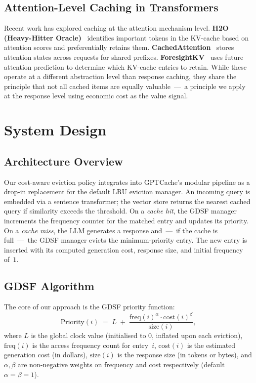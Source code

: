 \documentclass[sigconf, nonacm, review=false, screen=true]{acmart}
\begin{document}
\subsection{Attention-Level Caching in Transformers}
Recent work has explored caching at the attention mechanism level.
\textbf{H2O (Heavy-Hitter Oracle)}~\cite{h2o} identifies important tokens
in the KV-cache based on attention scores and preferentially retains them.
\textbf{CachedAttention}~\cite{cachedattention} stores attention states
across requests for shared prefixes. \textbf{ForesightKV}~\cite{foresightkv}
uses future attention prediction to determine which KV-cache entries to
retain. While these operate at a different abstraction level than response
caching, they share the principle that not all cached items are equally
valuable~---~a principle we apply at the response level using economic
cost as the value signal.

\section{System Design}
\label{sec:design}

\subsection{Architecture Overview}
Our cost-aware eviction policy integrates into GPTCache's modular pipeline
as a drop-in replacement for the default LRU eviction manager. An incoming
query is embedded via a sentence transformer; the vector store returns the
nearest cached query if similarity exceeds the threshold. On a
\emph{cache hit}, the GDSF manager increments the frequency counter for
the matched entry and updates its priority. On a \emph{cache miss}, the
LLM generates a response and~---~if the cache is full~---~the GDSF
manager evicts the minimum-priority entry. The new entry is inserted with
its computed generation cost, response size, and initial frequency of~$1$.

\subsection{GDSF Algorithm}
The core of our approach is the GDSF priority function:
\begin{equation}
  \text{Priority}(i) \;=\; L \;+\; \frac{\text{freq}(i)^{\alpha} \cdot \text{cost}(i)^{\beta}}{\text{size}(i)},
  \label{eq:gdsf}
\end{equation}
where $L$ is the global clock value (initialised to $0$, inflated upon
each eviction), $\text{freq}(i)$ is the access frequency count for
entry~$i$, $\text{cost}(i)$ is the estimated generation cost (in dollars),
$\text{size}(i)$ is the response size (in tokens or bytes), and
$\alpha, \beta$ are non-negative weights on frequency and cost
respectively (default $\alpha = \beta = 1$).
\end{document}
